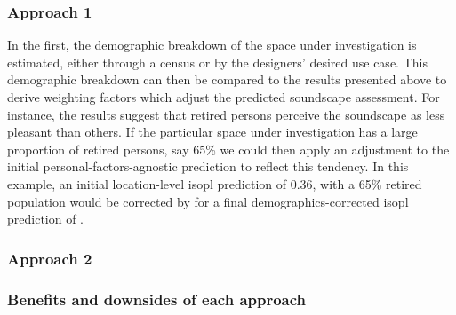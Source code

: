 \subsubsection{Approach 1}
In the first, the demographic breakdown of the space under investigation is estimated, either through a census or by the designers' desired use case. This demographic breakdown can then be compared to the results presented above \citep{Erfanian2021Psychological} to derive weighting factors which adjust the predicted soundscape assessment. For instance, the results suggest that retired persons perceive the soundscape as  less pleasant than others. If the particular space under investigation has a large proportion of retired persons, say 65\% we could then apply an adjustment to the initial personal-factors-agnostic prediction to reflect this tendency. In this example, an initial location-level \gls{isopl} prediction of 0.36, with a 65\% retired population would be corrected by  for a final demographics-corrected \gls{isopl} prediction of .

\subsubsection{Approach 2}

\subsubsection{Benefits and downsides of each approach}